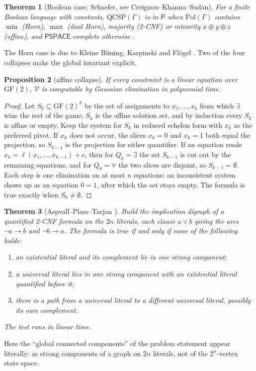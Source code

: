 \documentclass[11pt]{amsart}
\theoremstyle{plain}
\newtheorem{theorem}{Theorem}[section]
\newtheorem{proposition}[theorem]{Proposition}
\theoremstyle{definition}
\theoremstyle{remark}
\numberwithin{equation}{section}
\newcommand{\val}{\mathcal{V}}            %
\newcommand{\cls}[1]{\mathsf{#1}}
\newcommand{\PSPACE}{\cls{PSPACE}}
\newcommand{\Pclass}{\cls{P}}
\begin{document}
\begin{theorem}[Boolean case; Schaefer, see Creignou--Khanna--Sudan]\label{thm:schaefer}
For a finite Boolean language with constants, $\mathrm{QCSP}(\Gamma)$ is in $\Pclass$ when $\mathrm{Pol}(\Gamma)$ contains $\min$ (Horn), $\max$ (dual Horn), majority (2-CNF) or minority $x\oplus y\oplus z$ (affine), and $\PSPACE$-complete otherwise \cite{SchaeferSAT,CKS01}.
\end{theorem}
The Horn case is due to Kleine B\"uning, Karpinski and Fl\"ogel \cite{KBKF}. Two of the four collapses make the global invariant explicit.

\begin{proposition}[affine collapse]\label{prop:affine}
If every constraint is a linear equation over $\mathrm{GF}(2)$, $\val$ is computable by Gaussian elimination in polynomial time.
\end{proposition}
\begin{proof}
Let $S_k\subseteq\mathrm{GF}(2)^k$ be the set of assignments to $x_1,\dots,x_k$ from which $\exists$ wins the rest of the game; $S_n$ is the affine solution set, and by induction every $S_k$ is affine or empty. Keep the system for $S_k$ in reduced echelon form with $x_k$ as the preferred pivot. If $x_k$ does not occur, the slices $x_k=0$ and $x_k=1$ both equal the projection, so $S_{k-1}$ is the projection for either quantifier. If an equation reads $x_k=\ell(x_1,\dots,x_{k-1})+c$, then for $Q_k=\exists$ the set $S_{k-1}$ is cut out by the remaining equations, and for $Q_k=\forall$ the two slices are disjoint, so $S_{k-1}=\emptyset$. Each step is one elimination on at most $n$ equations; an inconsistent system shows up as an equation $0=1$, after which the set stays empty. The formula is true exactly when $S_0\ne\emptyset$.
\end{proof}

\begin{theorem}[Aspvall--Plass--Tarjan \cite{APT}]\label{thm:apt}
Build the implication digraph of a quantified 2-CNF formula on the $2n$ literals, each clause $a\lor b$ giving the arcs $\neg a\to b$ and $\neg b\to a$. The formula is true if and only if none of the following holds:
\begin{enumerate}[label=\textup{(\arabic*)}]
\item an existential literal and its complement lie in one strong component;
\item a universal literal lies in one strong component with an existential literal quantified before it;
\item there is a path from a universal literal to a different universal literal, possibly its own complement.
\end{enumerate}
The test runs in linear time.
\end{theorem}
Here the ``global connected components'' of the problem statement appear literally: as strong components of a graph on $2n$ literals, not of the $2^n$-vertex state space.
\end{document}
